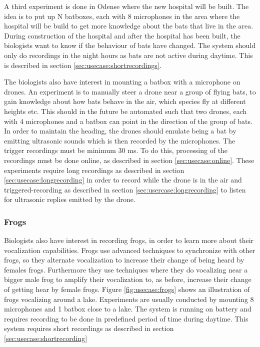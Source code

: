 A third experiment is done in Odense where the new hospital will be built.
The idea is to put up N batboxes, each with 8 microphones in the area where the hospital will be build to get more knowledge about the bats that live in the area. During  construction of the hospital and after the hospital has been built, the biologists want to know if the behaviour of bats have changed. The system should only do recordings in the night hours as bats are not active during daytime. This is described in section \ref{sec:usecase:shortrecordings}.

The biologists also have interest in mounting a batbox with a microphone on drones. An experiment is to manually steer a drone near a group of flying bats, to gain knowledge about how bats behave in the air, which species fly at different heights etc. This should in the future be automated such that two drones, each with 4 microphones and a batbox can point in the direction of the group of bats. In order to maintain the heading, the drones should emulate being a bat by emitting ultrasonic sounds which is then recorded by the microphones. The trigger recordings must be minimum 30 ms. To do this, processing of the recordings must be done online, as described in section \ref{sec:usecase:online}.
These experiments require long recordings as described in section \ref{sec:usecase:longrecording} in order to record while the drone is in the air and triggered-recording as described in section \ref{sec:usercase:longrecording} to listen for ultrasonic replies emitted by the drone.

\subsubsection{Frogs}
Biologists also have interest in recording frogs, in order to learn more about their vocalization capabilities. Frogs use advanced techniques to synchronize with other frogs, so they alternate vocalization to increase their change of being heard by females frogs. Furthermore they use techniques where they do vocalizing near a bigger male frog to amplify their vocalization to, as before, increase their change of getting hear by female frogs. Figure \ref{fig:usecase:frogs} shows an illustration of frogs vocalizing around a lake. Experiments are usually conducted by mounting 8 microphones and 1 batbox close to a lake. The system is running on battery and requires recording to be done in predefined period of time during daytime. This system requires short recordings as described in section \ref{sec:usecase:shortrecording}

